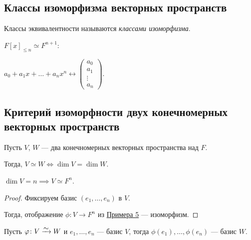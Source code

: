 \subsection{Классы изоморфизма векторных пространств}

\begin{definition}
    Классы эквивалентности называются \textit{классами изоморфизма}.   
\end{definition}

\begin{example}
    $F[x]_{\leq n} \simeq F^{n + 1}$:

    $a_0 + a_1 x + \dots + a_n x^n \longleftrightarrow \begin{pmatrix} a_0 \\ a_1 \\ \vdots \\ a_n \end{pmatrix}$.
\end{example}


\subsection{Критерий изоморфности двух конечномерных векторных пространств}

\begin{theorem}
    Пусть $V$, $W$ --- два конечномерных векторных пространства над $F$.

    Тогда, $V \simeq W \iff \dim V = \dim W$.
\end{theorem}

\begin{lemma}
    \label{lec16:lemma_1}
    $\dim V = n \implies V \simeq F^n$.
\end{lemma}

\begin{proof}
    Фиксируем базис $(e_1, \dots, e_n)$ в $V$.

    Тогда, отображение $\phi \colon V \to F^n$ из \hyperref[lec16:example_5]{Примера 5} --- изоморфизм.
\end{proof}

\begin{lemma}
    \label{lec16:lemma_2}
    Пусть $\phi \colon V \MapsTo W$ и $e_1, \dots, e_n$ --- базис $V$, тогда $\phi(e_1), \dots, \phi(e_n)$ --- базис $W$. 
\end{lemma}

